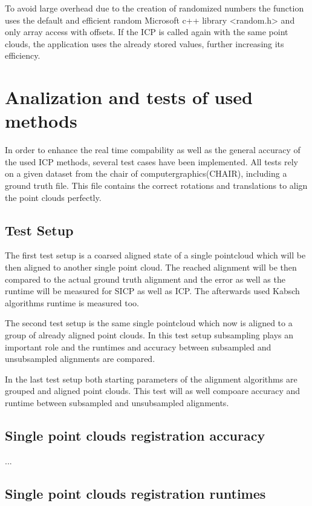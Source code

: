 \documentclass[hyperref,english,bachelorofscience,bibnum]{cgvpub}
\begin{document}
To avoid large overhead due to the creation of randomized numbers the function uses the default and efficient random Microsoft c++ library <random.h> and only array access with offsets. If the ICP is called again with the same point clouds, the application uses the already stored values, further increasing its efficiency.

\section{Analization and tests of used methods}

In order to enhance the real time compability as well as the general accuracy of the used ICP methods, several test cases have been implemented. All tests rely on a given dataset from the chair of computergraphics(CHAIR), including a ground truth file. This file contains the correct rotations and translations to align the point clouds perfectly.

 \subsection{Test Setup}

The first test setup is a coarsed aligned state of a single pointcloud which will be then aligned to another single point cloud. The reached alignment will be then compared to the actual ground truth alignment and the error as well as the runtime will be measured for SICP as well as ICP. The afterwards used Kabsch algorithms runtime is measured too.

The second test setup is the same single pointcloud which now is aligned to a group of already aligned point clouds. In this test setup subsampling plays an important role and the runtimes and accuracy between subsampled and unsubsampled alignments are compared.

In the last test setup both starting parameters of the alignment algorithms are grouped and aligned point clouds. This test will as well compoare accuracy and runtime between subsampled and unsubsampled alignments.

\subsection{Single point clouds  registration accuracy}

...

\subsection{Single point clouds registration runtimes}
\end{document}
